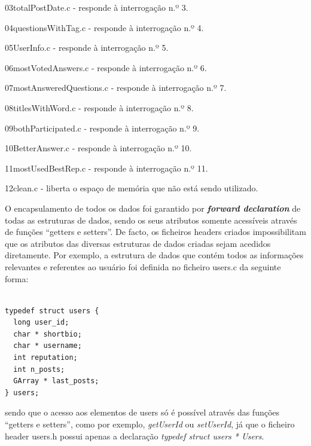 \documentclass[a4paper]{report}
\begin{document}
\begin{itemize}
\begin{item} 03totalPostDate.c - responde à interrogação n.º 3.\end{item}
\begin{item} 04questionsWithTag.c - responde à interrogação n.º 4.\end{item}
\begin{item} 05UserInfo.c - responde à interrogação n.º 5.\end{item}
\begin{item} 06mostVotedAnswers.c - responde à interrogação n.º 6.\end{item}
\begin{item} 07mostAnsweredQuestions.c - responde à interrogação n.º 7.\end{item}
\begin{item} 08titlesWithWord.c - responde à interrogação n.º 8.\end{item}
\begin{item} 09bothParticipated.c - responde à interrogação n.º 9.\end{item}
\begin{item} 10BetterAnswer.c - responde à interrogação n.º 10.\end{item}
\begin{item} 11mostUsedBestRep.c - responde à interrogação n.º 11.\end{item}
\begin{item} 12clean.c - liberta o espaço de memória que não está sendo utilizado.\end{item}
\end{itemize}


O encapsulamento de todos os dados foi garantido por \textbf{\textit{forward declaration}}
de todas as estruturas de dados, sendo os seus atributos somente acessíveis através
de funções ``getters e setters''. De facto, os ficheiros headers criados impossibilitam
que os atributos das diversas estruturas de dados criadas sejam acedidos diretamente.
Por exemplo, a estrutura de dados que contém todos as informações relevantes e
referentes ao usuário foi definida no ficheiro users.c da seguinte forma:

\begin{verbatim}

typedef struct users {
  long user_id;
  char * shortbio;
  char * username;
  int reputation;
  int n_posts;
  GArray * last_posts;
} users;

\end{verbatim}

sendo que o acesso aos elementos de users só é possível através das funções
``getters e setters'', como por exemplo, \textit{getUserId} ou
\textit{setUserId}, já que o ficheiro header users.h possui apenas a declaração
\textit{typedef struct users * Users}.
\end{document}
